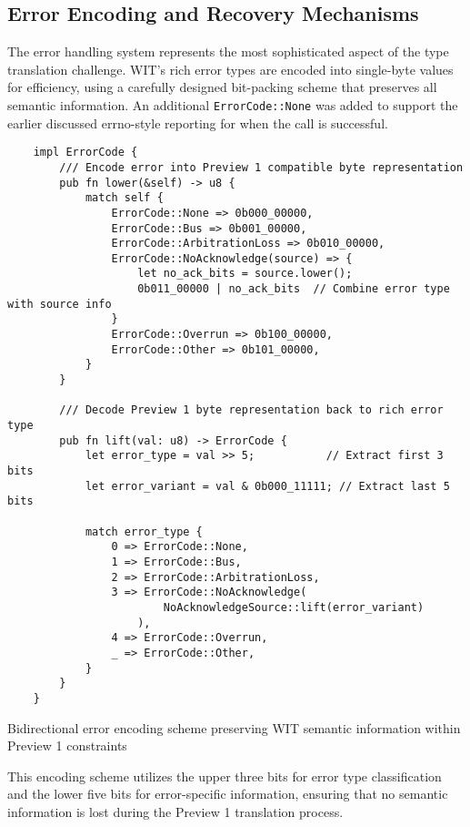 \subsection{Error Encoding and Recovery Mechanisms}

The error handling system represents the most sophisticated aspect of the type translation challenge. WIT's rich error types are encoded into single-byte values for efficiency, using a carefully designed bit-packing scheme that preserves all semantic information. An additional \texttt{ErrorCode::None} was added to support the earlier discussed errno-style reporting for when the call is successful.

\begin{listing}[H]
    \begin{verbatim}
    impl ErrorCode {
        /// Encode error into Preview 1 compatible byte representation
        pub fn lower(&self) -> u8 {
            match self {
                ErrorCode::None => 0b000_00000,
                ErrorCode::Bus => 0b001_00000,
                ErrorCode::ArbitrationLoss => 0b010_00000,
                ErrorCode::NoAcknowledge(source) => {
                    let no_ack_bits = source.lower();
                    0b011_00000 | no_ack_bits  // Combine error type with source info
                }
                ErrorCode::Overrun => 0b100_00000,
                ErrorCode::Other => 0b101_00000,
            }
        }
    
        /// Decode Preview 1 byte representation back to rich error type
        pub fn lift(val: u8) -> ErrorCode {
            let error_type = val >> 5;           // Extract first 3 bits
            let error_variant = val & 0b000_11111; // Extract last 5 bits
            
            match error_type {
                0 => ErrorCode::None,
                1 => ErrorCode::Bus,
                2 => ErrorCode::ArbitrationLoss,
                3 => ErrorCode::NoAcknowledge(
                        NoAcknowledgeSource::lift(error_variant)
                    ),
                4 => ErrorCode::Overrun,
                _ => ErrorCode::Other,
            }
        }
    }
    \end{verbatim}
    \caption{Bidirectional error encoding scheme preserving WIT semantic information within Preview 1 constraints}
    \label{lst:error-encoding}
\end{listing}

This encoding scheme utilizes the upper three bits for error type classification and the lower five bits for error-specific information, ensuring that no semantic information is lost during the Preview 1 translation process.

